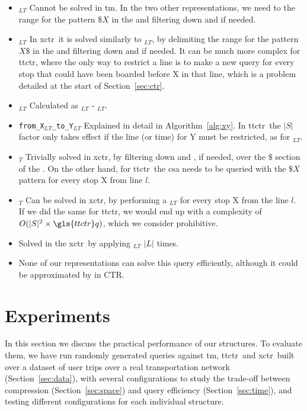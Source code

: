 \begin{itemize}
        \item \texttt{\startX$_{LT}$} Cannot be solved in \gls{tm}. In the two other representations, we need to the range for the pattern $\$X$ in the  and filtering down  and  if needed.
        \item \texttt{\endX$_{LT}$} In \gls{xctr}~it is solved similarly to \texttt{\startX$_{LT}$}, by delimiting the range for the pattern $X\$$ in the  and filtering down  and  if needed. It can be much more complex for \gls{ttctr}, where the only way to restrict a line is to make a new query for every stop that could have been boarded before X in that line, which is a problem detailed at the start of Section~\ref{sec:ctr}.
        \item \texttt{\switchX$_{LT}$} Calculated as \boardX$_{LT}$ - \startX$_{LT}$.
        \item \texttt{from\_X$_{LT}$\_to\_Y$_{LT}$} Explained in detail in Algorithm~\ref{alg:xy}. In \gls{ttctr}~the $|S|$ factor only takes effect if the line (or time) for Y must be restricted, as for \texttt{\endX$_{LT}$}.
        \item \texttt{\startL$_T$} Trivially solved in \gls{xctr}, by filtering down  and , if needed, over the $\$$ section of the . On the other hand, for \gls{ttctr}~the \gls{csa} needs to be queried with the $\$X$ pattern for every stop X from line $l$.
        \item \texttt{\endL$_T$} Can be solved in \gls{xctr}, by performing a \endX$_{LT}$ for every stop X from the line $l$. If we did the same for \gls{ttctr}, we would end up with a complexity of $O(|S|^2\times\gls{ttctr}q)$, which we consider prohibitive.
        \item \texttt{\startT} Solved in the \gls{xctr}~by applying \texttt{\startX$_{LT}$} $|L|$ times.
        \item \texttt{\endT} None of our representations can solve this query efficiently, although it could be approximated by \texttt{\startT} in CTR.
    \end{itemize}
	
\section{Experiments}
	In this section we discuss the practical performance of our structures. To evaluate them, we have run randomly generated queries against \gls{tm}, \gls{ttctr}~and \gls{xctr}~built over a dataset of user trips over a real transportation network (Section~\ref{sec:data}), with several configurations to study the trade-off between compression (Section~\ref{sec:space}) and query efficiency (Section~\ref{sec:time}), and testing different configurations for each individual structure.

